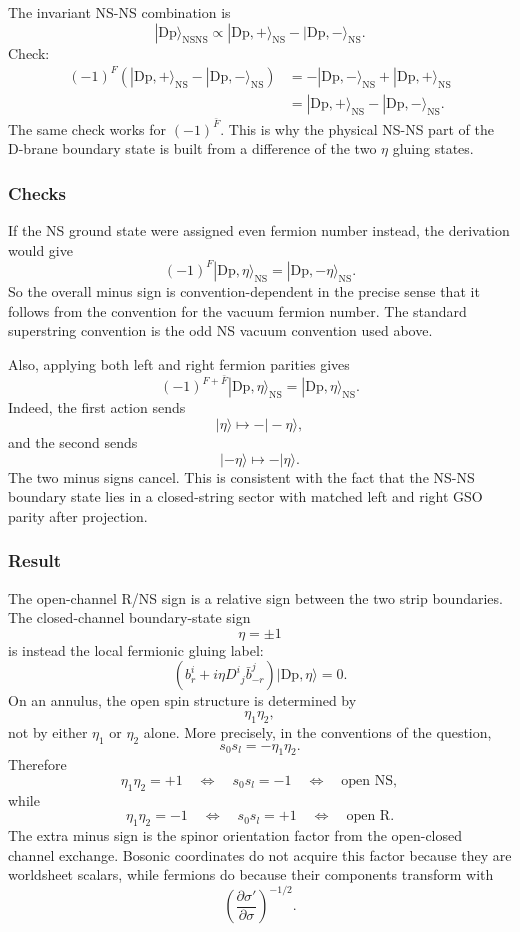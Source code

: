\documentclass[
  10pt,
  a4paper,
  openany]{book}
\begin{document}
The invariant NS-NS combination is \[
|\mathrm{Dp}\rangle_{\mathrm{NSNS}}
\propto
|\mathrm{Dp},+\rangle_{\mathrm{NS}}
-
|\mathrm{Dp},-\rangle_{\mathrm{NS}}.
\] Check: \[
\begin{aligned}
(-1)^F
\left(
|\mathrm{Dp},+\rangle_{\mathrm{NS}}
-
|\mathrm{Dp},-\rangle_{\mathrm{NS}}
\right)
&=
-|\mathrm{Dp},-\rangle_{\mathrm{NS}}
+
|\mathrm{Dp},+\rangle_{\mathrm{NS}}\\
&=
|\mathrm{Dp},+\rangle_{\mathrm{NS}}
-
|\mathrm{Dp},-\rangle_{\mathrm{NS}}.
\end{aligned}
\] The same check works for \((-1)^{\bar F}\). This is why the physical
NS-NS part of the D-brane boundary state is built from a difference of
the two \(\eta\) gluing states.

\subsubsection{Checks}\label{checks-3}

If the NS ground state were assigned even fermion number instead, the
derivation would give \[
(-1)^F|\mathrm{Dp},\eta\rangle_{\mathrm{NS}}
=
|\mathrm{Dp},-\eta\rangle_{\mathrm{NS}}.
\] So the overall minus sign is convention-dependent in the precise
sense that it follows from the convention for the vacuum fermion number.
The standard superstring convention is the odd NS vacuum convention used
above.

Also, applying both left and right fermion parities gives \[
(-1)^{F+\bar F}|\mathrm{Dp},\eta\rangle_{\mathrm{NS}}
=
|\mathrm{Dp},\eta\rangle_{\mathrm{NS}}.
\] Indeed, the first action sends \[
|\eta\rangle\mapsto -|-\eta\rangle,
\] and the second sends \[
|-\eta\rangle\mapsto -|\eta\rangle.
\] The two minus signs cancel. This is consistent with the fact that the
NS-NS boundary state lies in a closed-string sector with matched left
and right GSO parity after projection.

\subsubsection{Result}\label{result-7}

The open-channel R/NS sign is a relative sign between the two strip
boundaries. The closed-channel boundary-state sign \[
\eta=\pm 1
\] is instead the local fermionic gluing label: \[
\left(b_r^i+i\eta D^i{}_j\bar b^j_{-r}\right)
|\mathrm{Dp},\eta\rangle=0.
\] On an annulus, the open spin structure is determined by \[
\eta_1\eta_2,
\] not by either \(\eta_1\) or \(\eta_2\) alone. More precisely, in the
conventions of the question, \[
\boxed{
s_0s_l=-\eta_1\eta_2.
}
\] Therefore \[
\eta_1\eta_2=+1
\quad\Longleftrightarrow\quad
s_0s_l=-1
\quad\Longleftrightarrow\quad
\text{open NS},
\] while \[
\eta_1\eta_2=-1
\quad\Longleftrightarrow\quad
s_0s_l=+1
\quad\Longleftrightarrow\quad
\text{open R}.
\] The extra minus sign is the spinor orientation factor from the
open-closed channel exchange. Bosonic coordinates do not acquire this
factor because they are worldsheet scalars, while fermions do because
their components transform with \[
\left(\frac{\partial\sigma'}{\partial\sigma}\right)^{-1/2}.
\]
\end{document}
